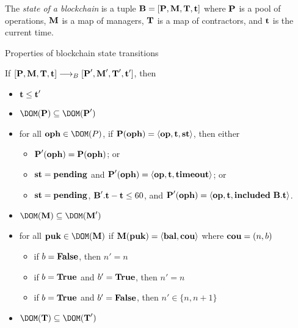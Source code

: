 \documentclass[a4paper]{llncs}
\begin{document}
\begin{definition}%
  The \emph{state of a blockchain} is a tuple
  $\textbf{B} = [\textbf{P}, \textbf{M}, \textbf{T}, \textbf{t}]$ where
  $\textbf{P}$ is a pool of operations, $\textbf{M}$ is a map of managers,
  $\textbf{T}$ is a map of contractors, and $\textbf{t}$ is the current
  time. 
\end{definition}

Properties of blockchain state transitions

If $[\textbf{P}, \textbf{M}, \textbf{T}, \textbf{t}] \stackrel{{}}\longrightarrow_B{}
[\textbf{P}', \textbf{M}', \textbf{T}', \textbf{t}']$, then
\begin{itemize}
\item $\textbf{t} \le \textbf{t}'$
\item $\DOM (\PENDING) \subseteq \DOM(\PENDING')$
\item for all $\OPH \in \DOM(P)$, if  $\textbf{P} (\textbf{oph}) = \langle\textbf{op},
    \textbf{t}, \textbf{st}\rangle$, then either
  \begin{itemize}
  \item     $\textbf{P}'    (\textbf{oph}) = \textbf{P} (\textbf{oph})$; or
  \item $\textbf{st}  = \textbf{pending}$ and $\textbf{P}' (\textbf{oph}) =
    \langle\textbf{op}, \textbf{t}, \textbf{timeout}\rangle$; or
  \item  $\textbf{st}  = \textbf{pending}$, $\textbf{B}'.\textbf{t} - \textbf{t}
    \le 60 $, and
    $\textbf{P}' (\textbf{oph}) =       \langle\textbf{op}, \textbf{t}, \textbf{included}\
      \textbf{B}.\textbf{t}\rangle$.
  \end{itemize}
    
 \item $ \DOM (\MANAGERS) \subseteq \DOM (\MANAGERS')$
 \item for all $\PUK \in \DOM (\MANAGERS)$ if $\textbf{M} (\textbf{puk}) =
   \langle\textbf{bal}, \textbf{cou}\rangle$ where $\textbf{cou} = (n, b)$
   \begin{itemize}
   \item if $b= \textbf{False}$, then $n' = n$
   \item if $b= \textbf{True}$ and $b'=\textbf{True}$, then $n' =n$
   \item if $b=\textbf{True}$ and $b'=\textbf{False}$, then $n' \in \{ n,  n+1\}$
   \end{itemize}

 \item $ \DOM (\CONTRACTORS) \subseteq \DOM (\CONTRACTORS')$

\end{itemize}
\end{document}
